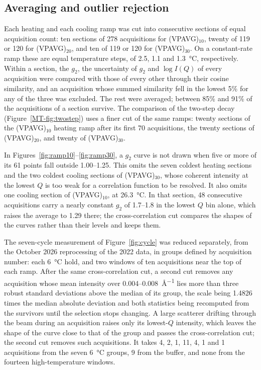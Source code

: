 \documentclass[11pt]{article}
\newcommand{\VP}[1]{(VPAVG)$_{#1}$}
\begin{document}
\subsection{Averaging and outlier rejection}

Each heating and each cooling ramp was cut into consecutive sections of equal acquisition count: ten sections of 278 acquisitions for \VP{10}, twenty of 119 or 120 for \VP{20}, and ten of 119 or 120 for \VP{30}. On a constant-rate ramp these are equal temperature steps, of 2.5, 1.1 and \SI{1.3}{\degreeCelsius}, respectively. Within a section, the $g_2$, the uncertainty of $g_2$ and $\log I(Q)$ of every acquisition were compared with those of every other through their cosine similarity, and an acquisition whose summed similarity fell in the lowest 5\% for any of the three was excluded. The rest were averaged; between 85\% and 91\% of the acquisitions of a section survive. The comparison of the two-step decay (Figure~\ref{MT-fig:twostep}) uses a finer cut of the same ramps: twenty sections of the \VP{10} heating ramp after its first 70 acquisitions, the twenty sections of \VP{20}, and twenty of \VP{30}.

In Figures~\ref{fig:ramp10}--\ref{fig:ramp30}, a $g_2$ curve is not drawn when five or more of its 61 points fall outside 1.00--1.25. This omits the seven coldest heating sections and the two coldest cooling sections of \VP{30}, whose coherent intensity at the lowest $Q$ is too weak for a correlation function to be resolved. It also omits one cooling section of \VP{10}, at \SI{26.3}{\degreeCelsius}. In that section, 48 consecutive acquisitions carry a nearly constant $g_2$ of 1.7--1.8 in the lowest $Q$ bin alone, which raises the average to 1.29 there; the cross-correlation cut compares the shapes of the curves rather than their levels and keeps them.

The seven-cycle measurement of Figure~\ref{fig:cycle} was reduced separately, from the October 2026 reprocessing of the 2022 data, in groups defined by acquisition number: each \SI{6}{\degreeCelsius} hold, and two windows of ten acquisitions near the top of each ramp. After the same cross-correlation cut, a second cut removes any acquisition whose mean intensity over 0.004--\SI{0.008}{\angstrom^{-1}} lies more than three robust standard deviations above the median of its group, the scale being 1.4826 times the median absolute deviation and both statistics being recomputed from the survivors until the selection stops changing. A large scatterer drifting through the beam during an acquisition raises only its lowest-$Q$ intensity, which leaves the shape of the curve close to that of the group and passes the cross-correlation cut; the second cut removes such acquisitions. It takes 4, 2, 1, 11, 4, 1 and 1 acquisitions from the seven \SI{6}{\degreeCelsius} groups, 9 from the buffer, and none from the fourteen high-temperature windows.
\end{document}
